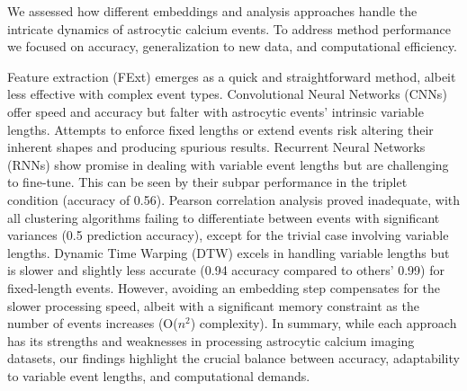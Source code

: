 We assessed how different embeddings and analysis approaches handle the intricate dynamics of astrocytic calcium events. To address method performance we focused on accuracy, generalization to new data, and computational efficiency. 

Feature extraction (FExt) emerges as a quick and straightforward method, albeit less effective with complex event types. Convolutional Neural Networks (CNNs) offer speed and accuracy but falter with astrocytic events' intrinsic variable lengths. Attempts to enforce fixed lengths or extend events risk altering their inherent shapes and producing spurious results. Recurrent Neural Networks (RNNs) show promise in dealing with variable event lengths but are challenging to fine-tune. This can be seen by their subpar performance in the triplet condition (accuracy of 0.56). Pearson correlation analysis proved inadequate, with all clustering algorithms failing to differentiate between events with significant variances (0.5 prediction accuracy), except for the trivial case involving variable lengths. Dynamic Time Warping (DTW) excels in handling variable lengths but is slower and slightly less accurate (0.94 accuracy compared to others' 0.99) for fixed-length events. However, avoiding an embedding step compensates for the slower processing speed, albeit with a significant memory constraint as the number of events increases (O($n^2$) complexity). In summary, while each approach has its strengths and weaknesses in processing astrocytic calcium imaging datasets, our findings highlight the crucial balance between accuracy, adaptability to variable event lengths, and computational demands.

